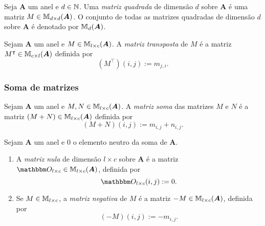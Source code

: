 \begin{definition}
	Seja $\bm A$ um anel e $d \in \mathbb{N}$. Uma \emph{matriz quadrada} de dimensão $d$ sobre $\bm A$ é uma matriz $M \in \mathbb{M}_{d \times d}(\bm A)$. O conjunto de todas as matrizes quadradas de dimensão $d$ sobre $\bm A$ é denotado por $\mathbb{M}_d(\bm A)$.
\end{definition}

\begin{definition}
	Sejam $\bm A$ um anel e $M \in \mathbb{M}_{l \times c}(\bm A)$. A \emph{matriz transposta} de $M$ é a matriz $M^\intercal \in \mathbb{M}_{c \times l}(\bm A)$ definida por
	\begin{equation*}
	(M^\intercal)(i,j) := m_{j,i}.
	\end{equation*}
\end{definition}

\subsubsection{Soma de matrizes}

\begin{definition}
	Sejam $\bm A$ um anel e $M,N \in \mathbb{M}_{l \times c}(\bm A)$. A \emph{matriz soma} das matrizes $M$ e $N$ é a matriz $(M+N) \in \mathbb{M}_{l \times c}(\bm A)$ definida por
	\begin{equation*}
	(M+N)(i,j) := m_{i,j}+n_{i,j}.
	\end{equation*}
\end{definition}

\begin{definition}
	Sejam $\bm A$ um anel e $0$ o elemento neutro da soma de $\bm A$.
	\begin{enumerate}
	\item A \emph{matriz nula} de dimensão $l \times c$ sobre $\bm A$ é a matriz $\zero_{l \times c} \in \M_{l \times c}(\bm A)$, definida por
		\begin{equation*}
		\zero_{l \times c}(i,j) := 0.
		\end{equation*}
	\item Se $M \in \mathbb{M}_{l \times c}$, a \emph{matriz negativa} de $M$ é a matriz $-M \in \mathbb{M}_{l \times c}(\bm A)$, definida por
		\begin{equation*}
		(-M)(i,j) := -m_{i,j}.
		\end{equation*}
	\end{enumerate}
\end{definition}

